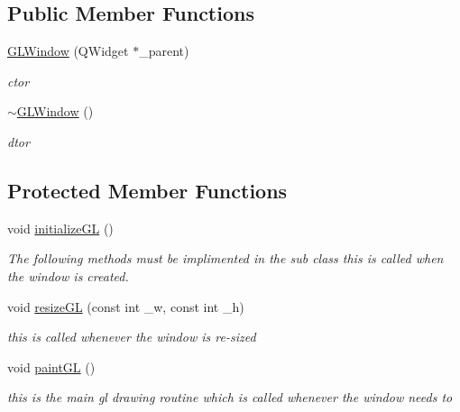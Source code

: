 \subsection*{Public Member Functions}
\begin{DoxyCompactItemize}
\item 
\hyperlink{class_g_l_window_a8dfc33113be0a86a53ddbea054f75292}{GLWindow} (QWidget $\ast$\_\-parent)
\begin{DoxyCompactList}\small\item\em ctor \item\end{DoxyCompactList}\item 
\hyperlink{class_g_l_window_a2eeaea2148f4f72344edd6d1bac9759b}{$\sim$GLWindow} ()
\begin{DoxyCompactList}\small\item\em dtor \item\end{DoxyCompactList}\end{DoxyCompactItemize}
\subsection*{Protected Member Functions}
\begin{DoxyCompactItemize}
\item 
void \hyperlink{class_g_l_window_a39e39761cd7323806917a217cc7caea5}{initializeGL} ()
\begin{DoxyCompactList}\small\item\em The following methods must be implimented in the sub class this is called when the window is created. \item\end{DoxyCompactList}\item 
void \hyperlink{class_g_l_window_abe57c0f40e59cba4c98759121e22eb47}{resizeGL} (const int \_\-w, const int \_\-h)
\begin{DoxyCompactList}\small\item\em this is called whenever the window is re-\/sized \item\end{DoxyCompactList}\item 
void \hyperlink{class_g_l_window_a9bd2503dd5f812c10a9481f22ecd3403}{paintGL} ()
\begin{DoxyCompactList}\small\item\em this is the main gl drawing routine which is called whenever the window needs to \item\end{DoxyCompactList}\end{DoxyCompactItemize}

